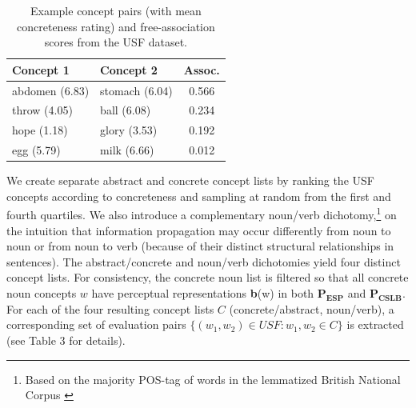  \begin{table}[t]\begin{center}\begin{tabular}{l|l|c}



\bf Concept 1 & \bf Concept 2 & \bf Assoc. \\
 \hline 
abdomen \footnotesize{ (6.83)} & stomach \footnotesize{ (6.04)} & 0.566 \\
throw \footnotesize{  (4.05)} & ball  \footnotesize{ (6.08)} & 0.234 \\
hope \footnotesize{  (1.18)} & glory \footnotesize{ (3.53)} & 0.192 \\
egg \footnotesize{ (5.79)} & milk \footnotesize{ (6.66)} & 0.012 \\



\end{tabular}\end{center}\caption{\label{font-table} Example concept pairs (with mean concreteness rating) and free-association scores from the USF dataset.}\end{table}






We create separate abstract and concrete concept lists by ranking the USF concepts according to concreteness and sampling at random from the first and fourth quartiles. We also introduce a complementary noun/verb dichotomy,\footnote{Based on the majority POS-tag of words in the lemmatized British National Corpus \cite{leech1994claws4}} on the intuition that information propagation may occur differently from noun to noun or from noun to verb (because of their distinct structural relationships in sentences). The abstract/concrete and noun/verb dichotomies yield four distinct concept lists. For consistency, the concrete noun list is filtered so that all concrete noun concepts \(w\) have perceptual representations {\bf b}(w) in both  \(\mathbf{P_{ESP}}\) and  \(\mathbf{P_{CSLB}}\). For each of the four resulting concept lists \(C\) (concrete/abstract, noun/verb), a corresponding set of evaluation pairs  \( \{ (w_1, w_2) \in USF :  w_1, w_2 \in C\}\) is extracted (see Table 3 for details). 



